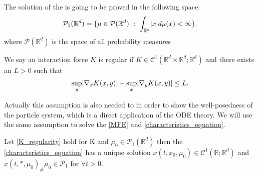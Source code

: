   The solution of the  is going to be proved in the following space: 
  \begin{align*}
    \mathcal{P}_1(\mathbb{R}^{d} ) = \{\mu \in \mathcal{P}(\mathbb{R}^{d} ) \ : \ \int_{\mathbb{R}^{d} } \lvert x\rvert d \mu(x) <\infty\}  
  .\end{align*}
  where $\mathcal{P}(\mathbb{R}^{d} )$ is the space of all probability measures


\begin{assumption}\label{K_regularity}
 We say an interaction force $K$ is regular if $K \in  \mathcal{C}^{1}(\mathbb{R}^{d} \times  \mathbb{R}^{d} ; \mathbb{R}^{d}   ) $ and there exists
 an $L > 0$ such that 
 \begin{align*}
   \sup_{y} \lvert\nabla_x K(x,y)\rvert + \sup_{x} \lvert\nabla_y K(x,y)\rvert \le L
 .\end{align*}
\end{assumption}
Actually this assumption is also needed to in order to show the well-posedness of the particle system, which is a direct application of the ODE theory.
We will use the same assumption to solve the \autoref{MFE} and \autoref{characteristics_equation}.
\begin{theorem}\label{existence_uniqueness_char}
  Let \autoref{K_regularity} hold for K and $\mu_0 \in \mathcal{P}_1(\mathbb{R}^{d} )$ then the 
  \autoref{characteristics_equation}  has a unique solution $x(t,x_{0},\mu_0) \in  \mathcal{C}^{1}(\mathbb{R};\mathbb{R}^{d}  ) $
  and $x(t,*,\mu_0)_\# \mu_0 \in  \mathcal{P}_1 $ for $\forall t > 0$.
\end{theorem}
